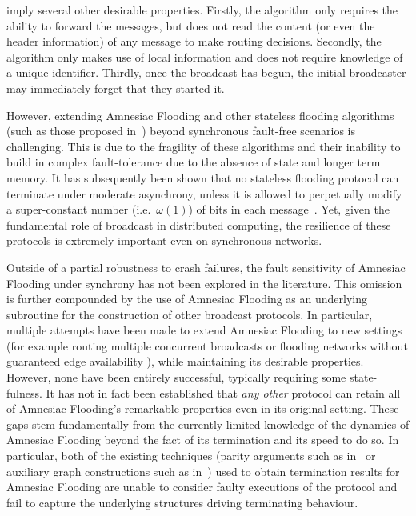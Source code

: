 
 imply several other desirable properties. Firstly, the algorithm only requires the ability to forward the messages, but does not read the content (or even the header information) of any message to make routing decisions. Secondly, the algorithm only makes use of local information and does not require knowledge of a unique identifier. Thirdly, once the broadcast has begun, the initial broadcaster may immediately forget that they started it.

However, extending Amnesiac Flooding and other stateless flooding algorithms (such as those proposed in~\cite{turau2020stateless,turau2021synchronous,bayramzadeh2021weak}) beyond synchronous fault-free scenarios is challenging. This is due to the fragility of these algorithms and their inability to build in complex fault-tolerance due to the absence of state and longer term memory. It has subsequently been shown that no stateless flooding protocol can terminate under moderate asynchrony, unless it is allowed to perpetually modify a super-constant number (i.e.~$\omega(1)$) of bits in each message~\cite{turau2020stateless}. Yet, given the fundamental role of broadcast in distributed computing, the resilience of these protocols is extremely important even on synchronous networks.

Outside of a partial robustness to crash failures, the fault sensitivity of Amnesiac Flooding under synchrony has not been explored in the literature. This omission is further compounded by the use of Amnesiac Flooding as an underlying subroutine for the construction of other broadcast protocols.
In particular, multiple attempts have been made to extend Amnesiac Flooding to new settings (for example routing multiple concurrent broadcasts \cite{bayramzadeh2021weak} or flooding networks without guaranteed edge availability \cite{turau2021synchronous}), while maintaining its desirable properties. 
However, none have been entirely successful, typically requiring some state-fulness.
It has not in fact been established that \textit{any other} protocol can retain all of Amnesiac Flooding's remarkable properties even in its original setting.
These gaps stem fundamentally from the currently limited knowledge of the dynamics of Amnesiac Flooding beyond the fact of its termination and its speed to do so.
In particular, both of the existing techniques (parity arguments such as in~\cite{hussak2023termination} or auxiliary graph constructions such as in~\cite{turau2021amnesiac}) used to obtain termination results for Amnesiac Flooding are unable to consider faulty executions of the protocol and fail to capture the underlying structures driving terminating behaviour.\\

